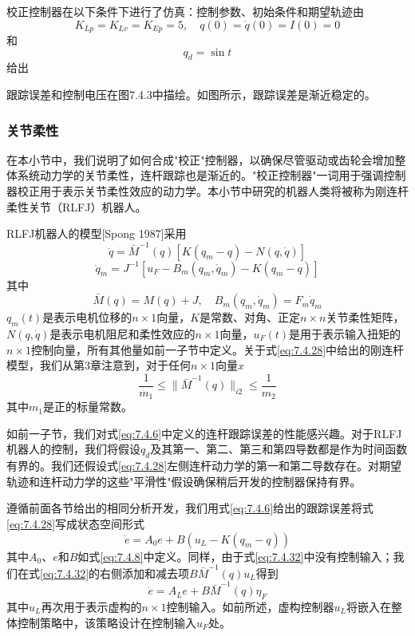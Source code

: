 \documentclass[UTF8]{ctexart}
\begin{document}
校正控制器在以下条件下进行了仿真：控制参数、初始条件和期望轨迹由
\begin{equation*}
K_{Lp} = K_{Lv} = K_{Ep} = 5, \quad q(0) = \dot{q}(0) = I(0) = 0
\end{equation*}
和
\begin{equation*}
q_d = \sin t
\end{equation*}
给出

跟踪误差和控制电压在图7.4.3中描绘。如图所示，跟踪误差是渐近稳定的。

\subsubsection*{关节柔性}

在本小节中，我们说明了如何合成"校正"控制器，以确保尽管驱动或齿轮会增加整体系统动力学的关节柔性，连杆跟踪也是渐近的。"校正控制器"一词用于强调控制器校正用于表示关节柔性效应的动力学。本小节中研究的机器人类将被称为刚连杆柔性关节（RLFJ）机器人。

RLFJ机器人的模型[Spong 1987]采用
\begin{equation}\label{eq:7.4.28}
\ddot{q} = \bar{M}^{-1}(q)[K(q_m - q) - N(q,\dot{q})]
\end{equation}
\begin{equation}\label{eq:7.4.29}
\ddot{q}_m = J^{-1}[u_F - B_m(q_m,\dot{q}_m) - K(q_m - q)]
\end{equation}
其中
\begin{equation}\label{eq:7.4.30}
\bar{M}(q) = M(q) + J, \quad B_m(q_m,\dot{q}_m) = F_m \dot{q}_m
\end{equation}
$q_m(t)$是表示电机位移的$n \times 1$向量，$K$是常数、对角、正定$n \times n$关节柔性矩阵，$N(q,\dot{q})$是表示电机阻尼和柔性效应的$n \times 1$向量，$u_F(t)$是用于表示输入扭矩的$n \times 1$控制向量，所有其他量如前一子节中定义。关于式\eqref{eq:7.4.28}中给出的刚连杆模型，我们从第3章注意到，对于任何$n \times 1$向量$x$
\begin{equation}\label{eq:7.4.31}
\frac{1}{m_1} \leq \|\bar{M}^{-1}(q)\|_{i2} \leq \frac{1}{m_2}
\end{equation}
其中$m_1$是正的标量常数。

如前一子节，我们对式\eqref{eq:7.4.6}中定义的连杆跟踪误差的性能感兴趣。对于RLFJ机器人的控制，我们将假设$q_d$及其第一、第二、第三和第四导数都是作为时间函数有界的。我们还假设式\eqref{eq:7.4.28}左侧连杆动力学的第一和第二导数存在。对期望轨迹和连杆动力学的这些"平滑性"假设确保稍后开发的控制器保持有界。

遵循前面各节给出的相同分析开发，我们用式\eqref{eq:7.4.6}给出的跟踪误差将式\eqref{eq:7.4.28}写成状态空间形式
\begin{equation}\label{eq:7.4.32}
\dot{e} = A_0 e + B(u_L - K(q_m - q))
\end{equation}
其中$A_0$、$e$和$B$如式\eqref{eq:7.4.8}中定义。同样，由于式\eqref{eq:7.4.32}中没有控制输入；我们在式\eqref{eq:7.4.32}的右侧添加和减去项$B\bar{M}^{-1}(q)u_L$得到
\begin{equation}\label{eq:7.4.33}
\dot{e} = A_L e + B\bar{M}^{-1}(q)\eta_F
\end{equation}
其中$u_L$再次用于表示虚构的$n \times 1$控制输入。如前所述，虚构控制器$u_L$将嵌入在整体控制策略中，该策略设计在控制输入$u_F$处。
\end{document}
